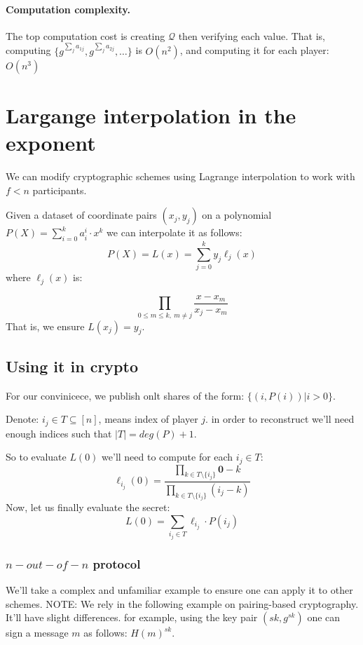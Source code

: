  \paragraph{Computation complexity.} The top computation cost is creating $\mathcal{Q}$ then verifying each value.
 That is, computing $ \{ g^{\sum_{j}{a_{1j}}}, g^{\sum_{j}{a_{2j}}},\dots\} $  is $O(n^2)$, and computing it for each player: $O(n^3)$ 


\section{Largange interpolation in the exponent} %
We can modify cryptographic schemes using Lagrange interpolation to work with $f<n$ participants.

Given a dataset of coordinate pairs $(x_j,y_j)$ on 
a polynomial $P(X)=\sum_{i=0}^{k}{a_i^{i}\cdot x^k}$ we can interpolate it as follows:
 $$P(X)=L(x)=\sum _{j=0}^{k}y_{j}\ell _{j}(x)$$
 where $\ell _{j}(x)$ is:

 $$\prod_{0\leq m\leq k, \ m\neq j}\frac {x-x_{m}}{x_{j}-x_{m}}$$
That is, we ensure $L(x_j)=y_j$.

\subsection{Using it in crypto}
For our convinicece, we publish onlt shares of the form: $\{(i,P(i))| i > 0\}$.

Denote: $i_j\in T\subseteq [n]$,  means index of player $j$.
in order to reconstruct we'll need enough indices such that $|T|=deg(P)+1$.

So to evaluate $L(0)$ we'll need to compute for each $i_j\in T$:
$$
 \ell_{i_j}(0) = \frac{
 \prod _{k\in T \setminus \{i_j\}}{\textbf{0}-k}
}{
  \prod_{k\in T \setminus \{i_j\}}{ (i_j - k)}
}
$$
Now, let us finally evaluate the secret:
$$ L(0) = \sum_{i_j \in T} {\ell_{i_j}\cdot P(i_j)} $$


\subsubsection*{$n-out-of-n$ protocol}
We'll take a complex and unfamiliar example to ensure one can apply it to other schemes.
NOTE: We rely in the following example on pairing-based cryptography. 
It'll have slight differences. 
for example, using the key pair $(sk, g^{sk})$ one can sign a message $m$ as follows: $H(m)^{sk}$.

